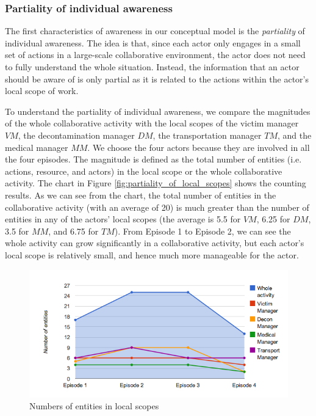 \subsubsection{Partiality of individual awareness} %
\label{ssub:partiality_of_awareness}
The first characteristics of awareness in our conceptual model is the \emph{partiality} of individual awareness. The idea is that, since each actor only engages in a small set of actions in a large-scale collaborative environment, the actor does not need to fully understand the whole situation. Instead, the information that an actor should be aware of is only partial as it is related to the actions within the actor’s local scope of work.

To understand the partiality of individual awareness, we compare the magnitudes of the whole collaborative activity with the local scopes of the victim manager $VM$, the decontamination manager $DM$, the transportation manager $TM$, and the medical manager $MM$. We choose the four actors because they are involved in all the four episodes. The magnitude is defined as the total number of entities (i.e. actions, resource, and actors) in the local scope or the whole collaborative activity. The chart in Figure \ref{fig:partiality_of_local_scopes} shows the counting results. As we can see from the chart, the total number of entities in the collaborative activity (with an average of 20) is much greater than the number of entities in any of the actors' local scopes (the average is 5.5 for $VM$, 6.25 for $DM$, 3.5 for $MM$, and 6.75 for $TM$). From Episode 1 to Episode 2, we can see the whole activity can grow significantly in a collaborative activity, but each actor's local scope is relatively small, and hence much more manageable for the actor.

\begin{figure}[htbp] %
	\centering
	\includegraphics[width=5.8in]{partiality_of_awareness_case.jpg} 
	\caption{Numbers of entities in local scopes}
	\label{fig:partiality_of_awareness_case}
\end{figure}


